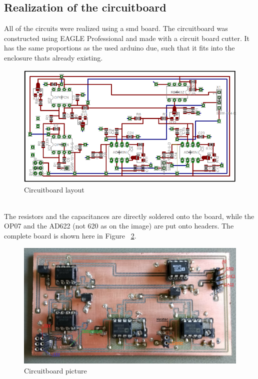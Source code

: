 \documentclass[12pt]{scrartcl}
\begin{document}
    \subsection{Realization of the circuitboard}
      All of the circuits were realized using a smd board. The circuitboard was
      constructed using EAGLE Professional and made with a circuit board cutter.
      It has the same proportions as the used arduino due, such that it fits
      into the enclosure thats already existing.
      \begin{figure}[h]
        \includegraphics[width = \textwidth]{board.png}
        \caption{Circuitboard layout}
        \label{fig4}
      \end{figure}
      \\The resistors and the capacitances are directly soldered onto the board,
      while the OP07 and the AD622 (not 620 as on the image) are put onto
      headers. The complete board is shown here in Figure~ \ref{fig5}.
      \begin{figure}
        \includegraphics[width = \textwidth]{boardbild.jpg}
        \caption{Circuitboard picture}
        \label{fig5}
      \end{figure}
\end{document}
